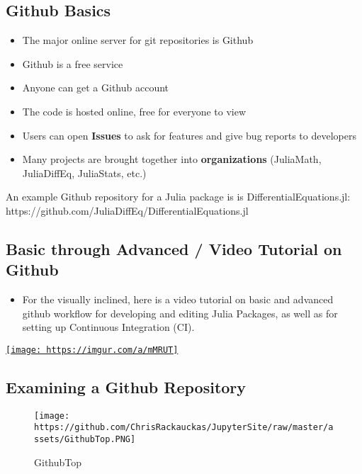 \documentclass[11pt]{article}
\makeatletter
\def\maxwidth{\ifdim\Gin@nat@width>\linewidth\linewidth
    \else\Gin@nat@width\fi}
\let\Oldincludegraphics\includegraphics
\renewcommand{\includegraphics}[1]{\Oldincludegraphics[width=.8\maxwidth]{#1}}
\providecommand{\tightlist}{%
      \setlength{\itemsep}{0pt}\setlength{\parskip}{0pt}}
\makeatother
\begin{document}
    \subsection{Github Basics}\label{github-basics}

\begin{itemize}
\tightlist
\item
  The major online server for git repositories is Github
\item
  Github is a free service
\item
  Anyone can get a Github account
\item
  The code is hosted online, free for everyone to view
\item
  Users can open \textbf{Issues} to ask for features and give bug
  reports to developers
\item
  Many projects are brought together into \textbf{organizations}
  (JuliaMath, JuliaDiffEq, JuliaStats, etc.)
\end{itemize}

An example Github repository for a Julia package is is
DifferentialEquations.jl:
https://github.com/JuliaDiffEq/DifferentialEquations.jl

    \subsection{Basic through Advanced / Video Tutorial on
Github}\label{basic-through-advanced-video-tutorial-on-github}

\begin{itemize}
\tightlist
\item
  For the visually inclined, here is a video tutorial on basic and
  advanced github workflow for developing and editing Julia Packages, as
  well as for setting up Continuous Integration (CI).
\end{itemize}

\href{https://www.youtube.com/watch?v=tx8DRc7_c9I}{\texttt{[image: https://imgur.com/a/mMRUT]}}

    \subsection{Examining a Github
Repository}\label{examining-a-github-repository}

\begin{figure}
\centering
\texttt{[image: https://github.com/ChrisRackauckas/JupyterSite/raw/master/assets/GithubTop.PNG]}
\caption{GithubTop}
\end{figure}
\end{document}
